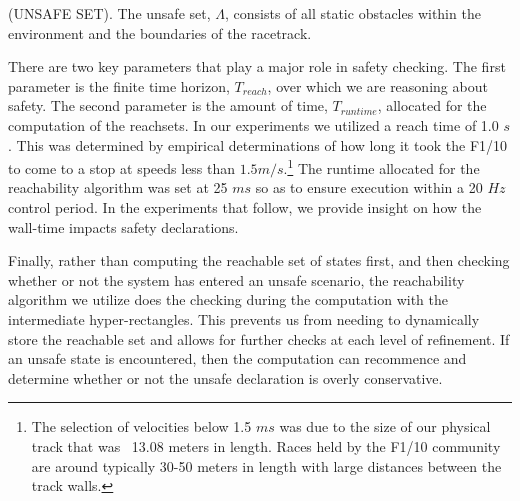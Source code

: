 \documentclass[manuscript,screen,review]{acmart}
\begin{document}
\begin{definition}%
(UNSAFE SET). The unsafe set,  $\Lambda$, consists of all static obstacles within the environment and the boundaries of the racetrack.
\end{definition}%


There are two key parameters that play a major role in safety checking. The first parameter is the finite time horizon, $T_{reach}$, over which we are reasoning about safety. The second parameter is the amount of time, $T_{runtime}$, allocated for the computation of the reachsets. In our experiments we utilized a reach time of 1.0 $s$. This was determined by empirical determinations of how long it took the F1/10 to come to a stop at speeds less than $1.5 m/s.$\footnote{The selection of velocities below 1.5 $ms$ was due to the size of our physical track that was ~13.08 meters in length. Races held by the F1/10 community are around typically 30-50 meters in length with large distances between the track walls.} The runtime allocated for the reachability algorithm was set at 25 $ms$ so as to ensure execution within a 20 $Hz$ control period. In the experiments that follow, we provide insight on how the wall-time impacts safety declarations. 

Finally, rather than computing the reachable set of states first, and then checking whether or not the system has entered an unsafe scenario, the reachability algorithm we utilize does the checking during the computation with the intermediate hyper-rectangles. This prevents us from needing to dynamically store the reachable set and allows for further checks at each level of refinement. If an unsafe state is encountered, then the computation can recommence and determine whether or not the unsafe declaration is overly conservative.

\end{document}
